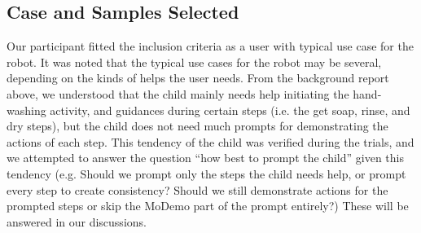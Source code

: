 \subsection{Case and Samples Selected}
Our participant fitted the inclusion criteria as a user with typical use case for the robot.  It was noted that the typical use cases for the robot may be several, depending on the kinds of helps the user needs.  From the background report above, we understood that the child mainly needs help initiating the hand-washing activity, and guidances during certain steps (i.e. the get soap, rinse, and dry steps), but the child does not need much prompts for demonstrating the actions of each step.  This tendency of the child was verified during the trials, and we attempted to answer the question ``how best to prompt the child'' given this tendency (e.g. Should we prompt only the steps the child needs help, or prompt every step to create consistency?  Should we still demonstrate actions for the prompted steps or skip the MoDemo part of the prompt entirely?)  These will be answered in our discussions.

